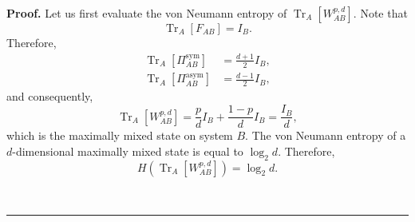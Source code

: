 \documentclass[twocolumn,letterpaper, dvipsnames,allowtoday, accepted = 2025-12-31]{quantumarticle}
\newenvironment{proof}[1][Proof]{\noindent\textbf{#1.} }{\ \rule{0.5em}{0.5em}}
\begin{document}
\begin{proof}
	Let us first evaluate the von Neumann entropy of $\operatorname{Tr}_A\!\left[W^{p,d}_{AB}\right]$. Note that 
	\begin{equation}
		\operatorname{Tr}_{A}\!\left[F_{AB}\right] = I_{B}.
	\end{equation}
	Therefore,
		\begin{align}
			\operatorname{Tr}_A\!\left[\Pi^{\operatorname{sym}}_{AB}\right] &= \frac{d+1}{2}I_{B},\label{eq:part_tr_sym_op}\\
			\operatorname{Tr}_A\!\left[\Pi^{\operatorname{asym}}_{AB}\right] &= \frac{d-1}{2}I_{B},\label{eq:part_tr_asym_op}
		\end{align}
		and consequently,
		\begin{equation}
			\operatorname{Tr}_{A}\!\left[W^{p,d}_{AB}\right] = \frac{p}{d}I_{B} + \frac{1-p}{d}I_{B} = \frac{I_B}{d},
		\end{equation}
		which is the maximally mixed state on system $B$. The von Neumann entropy of a $d$-dimensional maximally mixed state is equal to $\log_2 d$. Therefore,
		\begin{equation}\label{eq:VN_ent_werner_partial}
			H\!\left(\operatorname{Tr}_A\!\left[W^{p,d}_{AB}\right]\right) = \log_2 d.
		\end{equation}
	

\end{proof}
\end{document}
